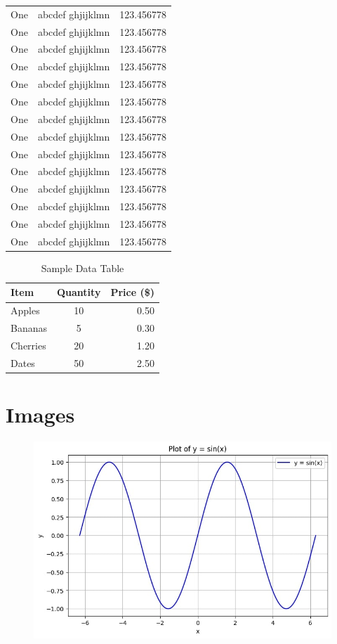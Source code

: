 {\begin{center}
\begin{longtable}{|l|l|l|}
		One & abcdef ghjijklmn & 123.456778 \\
		One & abcdef ghjijklmn & 123.456778 \\
		One & abcdef ghjijklmn & 123.456778 \\
		One & abcdef ghjijklmn & 123.456778 \\
		One & abcdef ghjijklmn & 123.456778 \\
		One & abcdef ghjijklmn & 123.456778 \\
		One & abcdef ghjijklmn & 123.456778 \\
		One & abcdef ghjijklmn & 123.456778 \\
		One & abcdef ghjijklmn & 123.456778 \\
		One & abcdef ghjijklmn & 123.456778 \\
		One & abcdef ghjijklmn & 123.456778 \\
		One & abcdef ghjijklmn & 123.456778 \\
		One & abcdef ghjijklmn & 123.456778 \\
		One & abcdef ghjijklmn & 123.456778 \\
	\end{longtable}
\end{center}
\begin{table}[ht]
	\centering
	\caption{Sample Data Table}
	\label{tab:sample}
	\begin{tabular}{l c r}
		\toprule
		\textbf{Item} & \textbf{Quantity} & \textbf{Price (\$)} \\
		\midrule
		Apples & 10 & 0.50 \\
		Bananas & 5 & 0.30 \\
		Cherries & 20 & 1.20 \\
		Dates & 50 & 2.50 \\
		\bottomrule
	\end{tabular}
\end{table}
\section{Images}
\begin{figure}
	\centering
	\includegraphics[width=0.7\linewidth]{figures/sinegraph}
	\caption{}
	\label{fig:sinegraph}
\end{figure}

}
